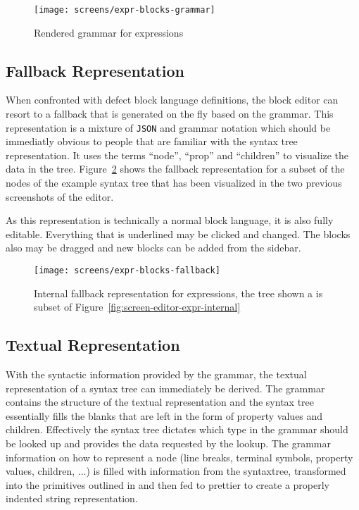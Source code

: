\documentclass[sigconf,natbib=false]{acmart}
\newcommand{\enquote}[1]{``#1''}
\begin{document}
\begin{figure}
  \texttt{[image: screens/expr-blocks-grammar]}
  \caption{Rendered grammar for expressions}
  \label{fig:screen-editor-expr-grammar}
\end{figure}

\subsection{Fallback Representation}

When confronted with defect block language definitions, the block editor can resort to a fallback that is generated on the fly based on the grammar. This representation is a mixture of \texttt{JSON} and grammar notation which should be immediatly obvious to people that are familiar with the syntax tree representation. It uses the terms \enquote{node}, \enquote{prop} and \enquote{children} to visualize the data in the tree. Figure~\ref{fig:screen-editor-expr-fallback} shows the fallback representation for a subset of the nodes of the example syntax tree that has been visualized in the two previous screenshots of the editor.

As this representation is technically a normal block language, it is also fully editable. Everything that is underlined may be clicked and changed. The blocks also may be dragged and new blocks can be added from the sidebar.

\begin{figure}
  \texttt{[image: screens/expr-blocks-fallback]}
  \caption{Internal fallback representation for expressions, the tree shown a is subset of Figure~\ref{fig:screen-editor-expr-internal}}
  \label{fig:screen-editor-expr-fallback}
\end{figure}

\subsection{Textual Representation}

With the syntactic information provided by the grammar, the textual representation of a syntax tree can immediately be derived. The grammar contains the structure of the textual representation and the syntax tree essentially fills the blanks that are left in the form of property values and children. Effectively the syntax tree dictates which type in the grammar should be looked up and provides the data requested by the lookup. The grammar information on how to represent a node (line breaks, terminal symbols, property values, children, ...) is filled with information from the syntaxtree, transformed into the primitives outlined in \cite{wadler_prettier_printer} and then fed to prettier to create a properly indented string representation.
\end{document}
